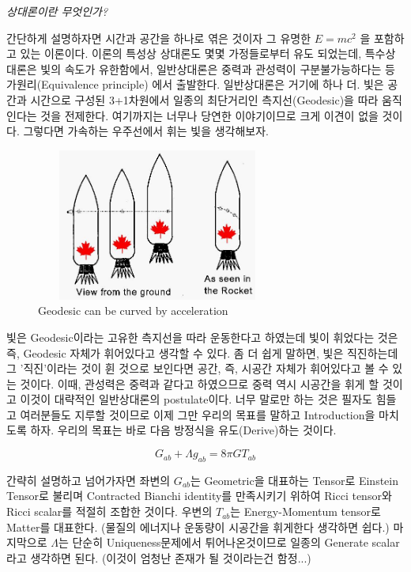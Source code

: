 \documentclass[final]{IEEEphot} %
\numberwithin{equation}{section} %
\numberwithin{figure}{section} %
\numberwithin{table}{section} %
\theoremstyle{plain}
\begin{document}
 \vspace{0.3cm}
 
 \emph{상대론이란 무엇인가?}
 
 \vspace{0.3cm}
 
 간단하게 설명하자면 시간과 공간을 하나로 엮은 것이자 그 유명한 $E=mc^2$ 을 포함하고 있는 이론이다. 이론의 특성상 상대론도 몇몇 가정들로부터 유도 되었는데, 특수상대론은 빛의 속도가 유한함에서, 일반상대론은 중력과 관성력이 구분불가능하다는 등가원리(Equivalence principle)
 에서 출발한다. 일반상대론은 거기에 하나 더. 빛은 공간과 시간으로 구성된 3+1차원에서 일종의 최단거리인 측지선(Geodesic)을 따라 움직인다는 것을 전제한다.\footnotemark
 여기까지는 너무나 당연한 이야기이므로 크게 이견이 없을 것이다. 그렇다면 가속하는 우주선에서 휘는 빛을 생각해보자.
 
 \begin{figure}[h]
  \centering
  \includegraphics[width=8cm, height=5cm]{relgen3.jpg}
  \caption{Geodesic can be curved by acceleration}
  \label{fig:rocket}
 \end{figure}

 빛은 Geodesic이라는 고유한 측지선을 따라 운동한다고 하였는데 빛이 휘었다는 것은 즉, Geodesic 자체가 휘어있다고 생각할 수 있다. 좀 더 쉽게 말하면, 빛은 직진하는데 그 '직진'이라는 것이 휜 것으로 보인다면 공간, 즉, 시공간
 자체가 휘어있다고 볼 수 있는 것이다. 이때, 관성력은 중력과 같다고 하였으므로 중력 역시 시공간을 휘게 할 것이고 이것이 대략적인 일반상대론의 postulate이다. 너무 말로만 하는 것은 필자도 힘들고 여러분들도 지루할 것이므로 
 이제 그만 우리의 목표를 말하고 Introduction을 마치도록 하자. 우리의 목표는 바로 다음 방정식을 유도(Derive)하는 것이다.
 
 \begin{equation}
  G_{ab} + \Lambda g_{ab} = 8\pi G T_{ab}
 \end{equation}

 간략히 설명하고 넘어가자면 좌변의 $G_{ab}$는 Geometric을 대표하는 Tensor로 Einstein Tensor로 불리며 Contracted Bianchi identity를 만족시키기 위하여 Ricci tensor와 Ricci scalar를 
 적절히 조합한 것이다. 우변의 $T_{ab}$는 Energy-Momentum tensor로 Matter를 대표한다. (물질의 에너지나 운동량이 시공간을 휘게한다 생각하면 쉽다.) 마지막으로 $\Lambda$는 단순히 Uniqueness문제에서 
 튀어나온것이므로 일종의 Generate scalar라고 생각하면 된다. (이것이 엄청난 존재가 될 것이라는건 함정...)
\newpage
\end{document}
